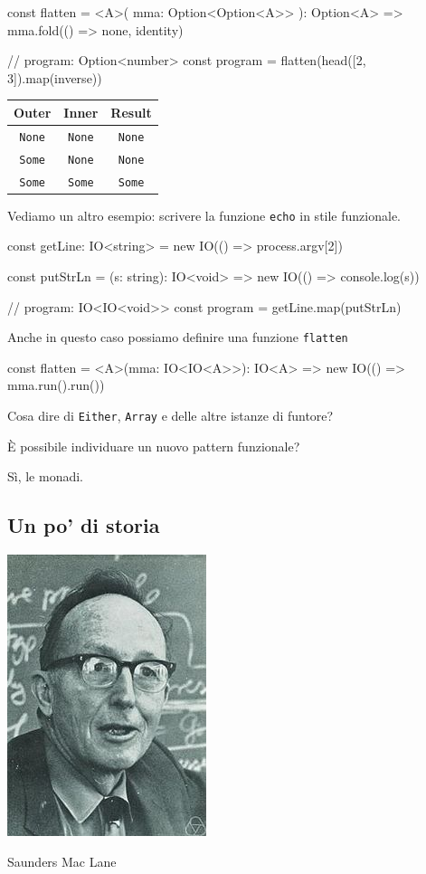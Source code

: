 \documentclass[12pt]{article}
\theoremstyle{definition}
\newenvironment{code}
  {\vspace{0.5cm} \VerbatimEnvironment\begin{typescriptcode}}
  {\end{typescriptcode} \vspace{0.2cm}}
\begin{document}
\begin{code}
const flatten = <A>(
  mma: Option<Option<A>>
): Option<A> => mma.fold(() => none, identity)

// program: Option<number>
const program = flatten(head([2, 3]).map(inverse))
\end{code}

\begin{center}
\begin{tabular}{ c c c }
 Outer & Inner & Result \\
 \hline
 \texttt{None} & \texttt{None} & \texttt{None} \\
 \texttt{Some} & \texttt{None} & \texttt{None} \\
 \texttt{Some} & \texttt{Some} & \texttt{Some}
\end{tabular}
\end{center}

Vediamo un altro esempio: scrivere la funzione \texttt{echo} in stile funzionale.

\begin{code}
const getLine: IO<string> = new IO(() => process.argv[2])

const putStrLn = (s: string): IO<void> =>
  new IO(() => console.log(s))

// program: IO<IO<void>>
const program = getLine.map(putStrLn)
\end{code}

Anche in questo caso possiamo definire una funzione \texttt{flatten}

\begin{code}
const flatten = <A>(mma: IO<IO<A>>): IO<A> =>
  new IO(() => mma.run().run())
\end{code}

Cosa dire di \texttt{Either}, \texttt{Array} e delle altre istanze di funtore?

È possibile individuare un nuovo pattern funzionale?

Sì, le monadi.

\subsection{Un po' di storia}

\begin{center}
\includegraphics[scale=0.6]{maclane}

Saunders Mac Lane
\end{center}
\end{document}
